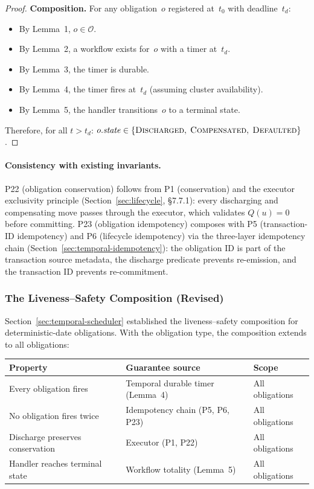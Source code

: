 \documentclass[11pt,a4paper]{article}
\begin{document}
\begin{proof}
\medskip
\noindent\textbf{Composition.} For any obligation~$o$ registered at~$t_0$ with deadline~$t_d$:
\begin{itemize}[nosep]
\item By Lemma~1, $o \in \mathcal{O}$.
\item By Lemma~2, a workflow exists for~$o$ with a timer at~$t_d$.
\item By Lemma~3, the timer is durable.
\item By Lemma~4, the timer fires at~$t_d$ (assuming cluster availability).
\item By Lemma~5, the handler transitions~$o$ to a terminal state.
\end{itemize}
Therefore, for all $t > t_d$: $o.\mathit{state} \in \{\textsc{Discharged},\; \textsc{Compensated},\; \textsc{Defaulted}\}$.
\end{proof}

\paragraph{Consistency with existing invariants.}
P22 (obligation conservation) follows from P1 (conservation) and the executor exclusivity principle (Section~\ref{sec:lifecycle}, \S7.7.1): every discharging and compensating move passes through the executor, which validates $Q(u) = 0$ before committing. P23 (obligation idempotency) composes with P5 (transaction-ID idempotency) and P6 (lifecycle idempotency) via the three-layer idempotency chain (Section~\ref{sec:temporal-idempotency}): the obligation ID is part of the transaction source metadata, the discharge predicate prevents re-emission, and the transaction ID prevents re-commitment.

\subsubsection{The Liveness--Safety Composition (Revised)}
\label{sec:liveness-safety-revised}

Section~\ref{sec:temporal-scheduler} established the liveness--safety composition for deterministic-date obligations. With the obligation type, the composition extends to all obligations:

\begin{center}
\small
\begin{tabular}{l l l}
\toprule
\textbf{Property} & \textbf{Guarantee source} & \textbf{Scope} \\
\midrule
Every obligation fires & Temporal durable timer (Lemma~4) & All obligations \\
No obligation fires twice & Idempotency chain (P5, P6, P23) & All obligations \\
Discharge preserves conservation & Executor (P1, P22) & All obligations \\
Handler reaches terminal state & Workflow totality (Lemma~5) & All obligations \\
\bottomrule
\end{tabular}
\end{center}
\end{document}
